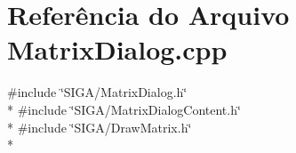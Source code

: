 \section{Referência do Arquivo Matrix\+Dialog.\+cpp}
\label{_matrix_dialog_8cpp}
{\ttfamily \#include \char`\"{}S\+I\+G\+A/\+Matrix\+Dialog.\+h\char`\"{}}\\*
{\ttfamily \#include \char`\"{}S\+I\+G\+A/\+Matrix\+Dialog\+Content.\+h\char`\"{}}\\*
{\ttfamily \#include \char`\"{}S\+I\+G\+A/\+Draw\+Matrix.\+h\char`\"{}}\\*
